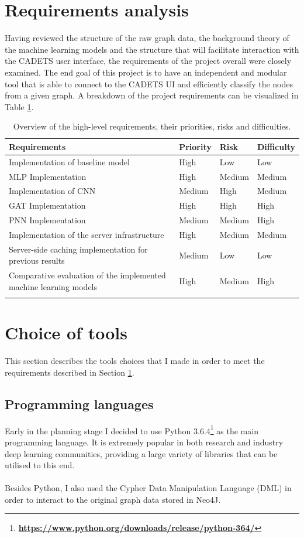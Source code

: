 	\section{Requirements analysis} \label{Section 2.4}
	Having reviewed the structure of the raw graph data, the background theory of the machine learning models and the structure that will facilitate interaction with the CADETS user interface, the requirements of the project overall were closely examined. The end goal of this project is to have an independent and modular tool that is able to connect to the CADETS UI and efficiently classify the nodes from a given graph. A breakdown of the project requirements can be visualized in Table \ref{Table 2.2}.
	\begin{longtable}{|p{}|p{} p{} p{}|}
		\textbf{Requirements} & \textbf{Priority} & \textbf{Risk} & \textbf{Difficulty} \\
		\hline
		Implementation of baseline model & High & Low & Low \\
		MLP Implementation & High & Medium & Medium \\
		Implementation of CNN & Medium & High & Medium \\
		GAT Implementation & High & High & High \\
		PNN Implementation & Medium & Medium & High \\
		Implementation of the server infrastructure & High & Medium & Medium \\
		Server-side caching implementation for previous results & Medium & Low & Low \\
		Comparative evaluation of the implemented machine learning models & High & Medium & High \\
		\hline
		\caption[Requirements overview]{\centering Overview of the high-level requirements, their priorities, risks and difficulties.}
		\label{Table 2.2}
	\end{longtable}
	\section{Choice of tools} \label{Section 2.5}
	This section describes the tools choices that I made in order to meet the requirements described in Section \ref{Section 2.4}. 
	\subsection{Programming languages} \label{Section 2.5.1}
	Early in the planning stage I decided to use Python 3.6.4\footnote{\textbf{\url{https://www.python.org/downloads/release/python-364/}}} as the main programming language. It is extremely popular in both research and industry deep learning communities, providing a large variety of libraries that can be utilised to this end. 
	\\ \\
	Besides Python, I also used the Cypher Data Manipulation Language (DML) in order to interact to the original graph data stored in Neo4J.  
	
